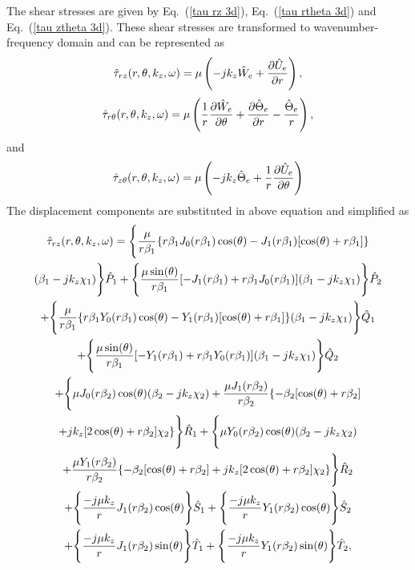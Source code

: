 \documentclass[10pt]{asme2ej}
\begin{document}
The shear stresses are given by Eq.~(\ref{tau rz 3d}), Eq.~(\ref{tau rtheta 3d}) and Eq.~(\ref{tau ztheta 3d}). These shear stresses are transformed to wavenumber-frequency domain and can be represented as
    \begin{equation}
        \Hat{\tau}_{rz}(r,\theta,k_z,\omega) = \mu\left(-jk_z \Hat{W}_e + \frac{\partial \Hat{U}_e}{\partial r}\right),
    \end{equation}
    \begin{equation}
        \Hat{\tau}_{r\theta}(r,\theta,k_z,\omega) = \mu\left(\frac{1}{r}\frac{\partial \Hat{W}_{e}}{\partial \theta} + \frac{\partial \Hat{\Theta}_{e}}{\partial r}-\frac{\Hat{\Theta}_e}{r}\right),
    \end{equation}
    and
    \begin{equation}
        \Hat{\tau}_{z\theta}(r,\theta,k_z,\omega) = \mu\left(-j k_z \Hat{\Theta}_{e} + \frac{1}{r}\frac{\partial \Hat{U}_{e}}{\partial \theta}\right)
    \end{equation}
    The displacement components are substituted in above equation and simplified as 
    \begin{multline}\label{shear stress r,z appendix}
        \Hat{\tau}_{rz}(r,\theta,k_z,\omega) = \Bigg\{\frac{\mu}{r\beta_1}\{r\beta_1 J_0(r\beta_1)\cos(\theta) - J_1(r\beta_1)[\cos(\theta) + r\beta_1]\}\\ (\beta_1 - jk_z\chi_1)\Bigg\}\Hat{P}_1 + \Bigg\{\frac{\mu\sin(\theta)}{r\beta_1}[-J_1(r\beta_1) + r\beta_1 J_0(r\beta_1)](\beta_1-jk_z\chi_1)\Bigg\}\Hat{P}_2\\ + \Bigg\{\frac{\mu}{r\beta_1}\{r\beta_1 Y_0(r\beta_1)\cos(\theta) - Y_1(r\beta_1)[\cos(\theta) + r\beta_1]\}(\beta_1 - jk_z\chi_1)\Bigg\}\Hat{Q}_1\\ + \Bigg\{\frac{\mu\sin(\theta)}{r\beta_1}[-Y_1(r\beta_1) + r\beta_1 Y_0(r\beta_1)](\beta_1-jk_z\chi_1)\Bigg\}\Hat{Q}_2\\ + \Bigg\{\mu J_0(r\beta_2)\cos(\theta)(\beta_2 - jk_z\chi_2) + \frac{\mu J_1(r\beta_2)}{r\beta_2}\{-\beta_2[\cos(\theta) + r\beta_2]\\ + jk_z[2\cos(\theta) + r\beta_2]\chi_2\}\Bigg\}\Hat{R}_1 + \Bigg\{\mu Y_0(r\beta_2)\cos(\theta)(\beta_2 - jk_z\chi_2)\\ + \frac{\mu Y_1(r\beta_2)}{r\beta_2}\{-\beta_2[\cos(\theta) + r\beta_2] + jk_z[2\cos(\theta) + r\beta_2]\chi_2\}\Bigg\}\Hat{R}_2\\ + \Bigg\{\frac{-j\mu k_z}{r}J_1(r\beta_2)\cos(\theta)\Bigg\}\Hat{S}_1 + \Bigg\{\frac{-j\mu k_z}{r}Y_1(r\beta_2)\cos(\theta)\Bigg\}\Hat{S}_2\\ + \Bigg\{\frac{-j\mu k_z}{r}J_1(r\beta_2)\sin(\theta)\Bigg\}\Hat{T}_1 + \Bigg\{\frac{-j\mu k_z}{r}Y_1(r\beta_2)\sin(\theta)\Bigg\}\Hat{T}_2,
    \end{multline}
\end{document}
